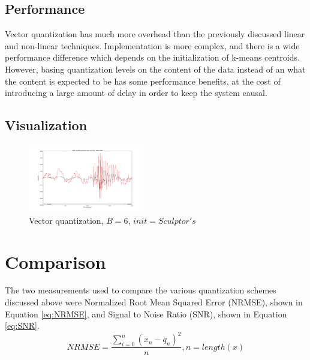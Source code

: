 \documentclass[journal]{IEEEtran}
\begin{document}
\subsection{Performance}
Vector quantization has much more overhead than the previously discussed linear and non-linear techniques. Implementation is more complex, and 
there is a wide performance difference which depends on the initialization of k-means centroids. However, basing quantization levels on the content
of the data instead of an what the content is expected to be has some performance benefits, at the cost of introducing a large amount of delay in order
to keep the system causal.

\subsection{Visualization}
\begin{figure}[h!]
\centering
  \includegraphics[width=0.45\textwidth]{vector_6bit.png}
\caption{Vector quantization, $B = 6$, $init = Sculptor's$}
\label{fig:vector}
\end{figure}

\section{Comparison}
The two measurements used to compare the various quantization schemes discussed above were Normalized Root Mean Squared Error (NRMSE), shown in Equation
\ref{eq:NRMSE}, and Signal to Noise Ratio (SNR), shown in Equation \ref{eq:SNR}. \cite{DSPBook}
\begin{equation}
    NRMSE = \frac{\sum_{i=0}^n (x_n - q_n)^2}{n}, n = length(x)
    \label{eq:NRMSE}
\end{equation}
\end{document}
